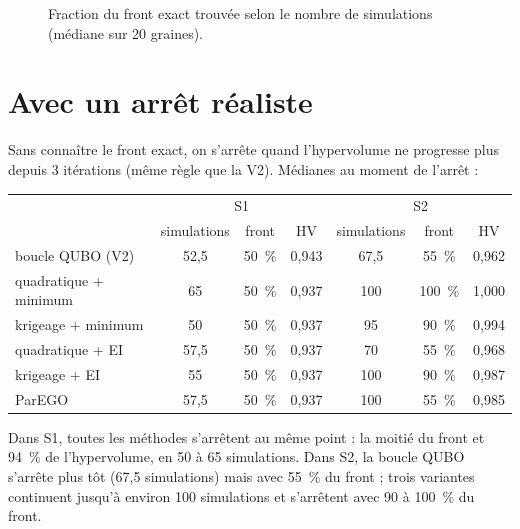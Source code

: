 \begin{figure}[htbp]
\centering

\caption{Fraction du front exact trouvée selon le nombre de simulations (médiane sur 20 graines).}\label{fig:l1-conv}
\end{figure}

\section{Avec un arrêt réaliste}
Sans connaître le front exact, on s'arrête quand l'hypervolume ne progresse plus depuis 3 itérations (même règle que la V2). Médianes au moment de l'arrêt :
\begin{center}
\begin{tabular}{lcccccc}
\toprule
 & \multicolumn{3}{c}{S1} & \multicolumn{3}{c}{S2} \\
 & simulations & front & HV & simulations & front & HV \\
\midrule
boucle QUBO (V2) & 52,5 & 50~\% & 0,943 & 67,5 & 55~\% & 0,962 \\
quadratique + minimum & 65 & 50~\% & 0,937 & 100 & 100~\% & 1,000 \\
krigeage + minimum & 50 & 50~\% & 0,937 & 95 & 90~\% & 0,994 \\
quadratique + EI & 57,5 & 50~\% & 0,937 & 70 & 55~\% & 0,968 \\
krigeage + EI & 55 & 50~\% & 0,937 & 100 & 90~\% & 0,987 \\
ParEGO & 57,5 & 50~\% & 0,937 & 100 & 55~\% & 0,985 \\
\bottomrule
\end{tabular}
\end{center}
Dans S1, toutes les méthodes s'arrêtent au même point : la moitié du front et 94~\% de l'hypervolume, en 50 à 65 simulations. Dans S2, la boucle QUBO s'arrête plus tôt (67,5 simulations) mais avec 55~\% du front ; trois variantes continuent jusqu'à environ 100 simulations et s'arrêtent avec 90 à 100~\% du front.

